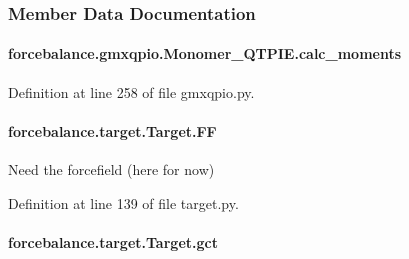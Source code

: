 \subsubsection{Member Data Documentation}
\hypertarget{classforcebalance_1_1gmxqpio_1_1Monomer__QTPIE_a62d13eba40da98dc26bbee9dce8d0d66}{
\paragraph[{calc\-\_\-moments}]{\setlength{\rightskip}{0pt plus 5cm}forcebalance.\-gmxqpio.\-Monomer\-\_\-\-Q\-T\-P\-I\-E.\-calc\-\_\-moments}}\label{classforcebalance_1_1gmxqpio_1_1Monomer__QTPIE_a62d13eba40da98dc26bbee9dce8d0d66}


Definition at line 258 of file gmxqpio.\-py.

\hypertarget{classforcebalance_1_1target_1_1Target_a38a37919783141ea37fdcf8b00ce0aaf}{
\paragraph[{F\-F}]{\setlength{\rightskip}{0pt plus 5cm}forcebalance.\-target.\-Target.\-F\-F\hspace{0.3cm}{\ttfamily [inherited]}}}\label{classforcebalance_1_1target_1_1Target_a38a37919783141ea37fdcf8b00ce0aaf}


Need the forcefield (here for now) 



Definition at line 139 of file target.\-py.

\hypertarget{classforcebalance_1_1target_1_1Target_aa625ac88c6744eb14ef281d9496d0dbb}{
\paragraph[{gct}]{\setlength{\rightskip}{0pt plus 5cm}forcebalance.\-target.\-Target.\-gct\hspace{0.3cm}{\ttfamily [inherited]}}}\label{classforcebalance_1_1target_1_1Target_aa625ac88c6744eb14ef281d9496d0dbb}


